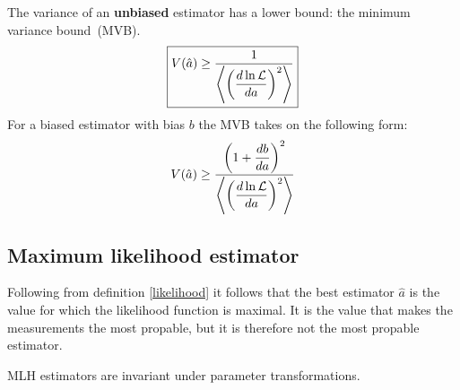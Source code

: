 {{    \begin{theorem}
    	The variance of an \textbf{unbiased} estimator has a lower bound: the minimum variance bound\footnotemark\ (MVB).
		\begin{equation}
			\label{statistics:theorem:minimum_variance_bound}
            \boxed{V(\hat{a})\geq\stylefrac{1}{\left<\left(\deriv{\ln\mathcal{L}}{a}\right)^2\right>}}
		\end{equation}
        For a biased estimator with bias $b$ the MVB takes on the following form:
        \begin{equation}
			\label{statistics:theorem:biased_minimum_variance_bound}
            V(\hat{a})\geq\stylefrac{\left(1+\deriv{b}{a}\right)^2}{\left<\left(\deriv{\ln\mathcal{L}}{a}\right)^2\right>}
		\end{equation}
	\end{theorem}
    
\subsection{Maximum likelihood estimator}
	Following from definition \ref{likelihood} it follows that the best estimator $\hat{a}$ is the value for which the likelihood function is maximal. It is the value that makes the measurements the most propable, but it is therefore not the most propable estimator.
    
    \begin{property}
		MLH estimators are invariant under parameter transformations.
	\end{property}
    
}}
